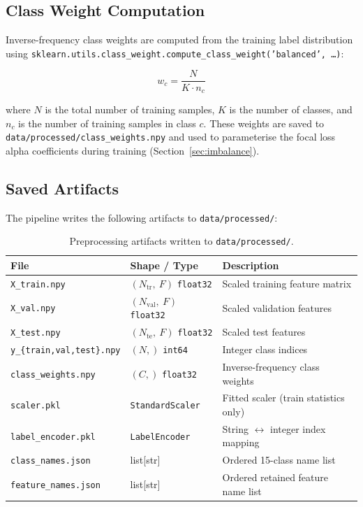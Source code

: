 \documentclass[12pt]{article}
\theoremstyle{plain}
\begin{document}
\subsection{Class Weight Computation}

Inverse-frequency class weights are computed from the training label distribution using \texttt{sklearn.utils.class\_weight.compute\_class\_weight('balanced', \ldots)}:

\begin{equation}
w_c = \frac{N}{K \cdot n_c}
\end{equation}

where $N$ is the total number of training samples, $K$ is the number of classes, and $n_c$ is the number of training samples in class $c$. These weights are saved to \texttt{data/processed/class\_weights.npy} and used to parameterise the focal loss alpha coefficients during training (Section~\ref{sec:imbalance}).

\subsection{Saved Artifacts}

The pipeline writes the following artifacts to \texttt{data/processed/}:

\begin{table}[H]
\centering
\caption{Preprocessing artifacts written to \texttt{data/processed/}.}
\label{tab:artifacts}
\begin{tabular}{lll}
\toprule
\textbf{File} & \textbf{Shape / Type} & \textbf{Description} \\
\midrule
\texttt{X\_train.npy} & $(N_{\text{tr}},\ F)$ \texttt{float32} & Scaled training feature matrix \\
\texttt{X\_val.npy} & $(N_{\text{val}},\ F)$ \texttt{float32} & Scaled validation features \\
\texttt{X\_test.npy} & $(N_{\text{te}},\ F)$ \texttt{float32} & Scaled test features \\
\texttt{y\_\{train,val,test\}.npy} & $(N,)$ \texttt{int64} & Integer class indices \\
\texttt{class\_weights.npy} & $(C,)$ \texttt{float32} & Inverse-frequency class weights \\
\texttt{scaler.pkl} & \texttt{StandardScaler} & Fitted scaler (train statistics only) \\
\texttt{label\_encoder.pkl} & \texttt{LabelEncoder} & String $\leftrightarrow$ integer index mapping \\
\texttt{class\_names.json} & list[str] & Ordered 15-class name list \\
\texttt{feature\_names.json} & list[str] & Ordered retained feature name list \\
\bottomrule
\end{tabular}
\end{table}
\end{document}

